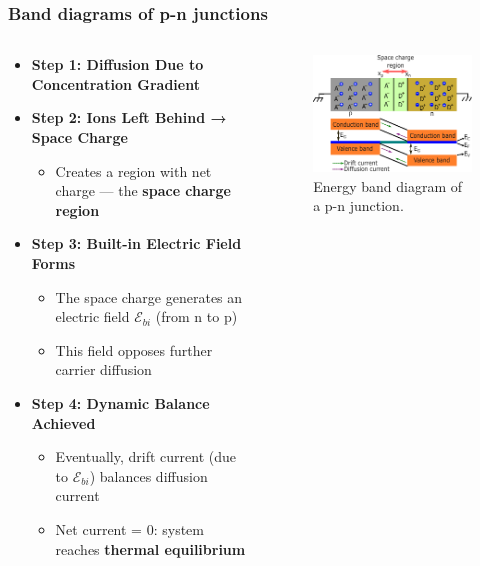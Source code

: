 \begin{frame}
	\frametitle{Band diagrams of p-n junctions}
	\begin{columns}
		\begin{column}{0.5\textwidth}
			\begin{itemize}
				\item \textbf{Step 1: Diffusion Due to Concentration Gradient}
				\item \textbf{Step 2: Ions Left Behind → Space Charge}
				\begin{itemize}
					\item Creates a region with net charge — the \textbf{space charge region}
				\end{itemize}
				\item \textbf{Step 3: Built-in Electric Field Forms}
				\begin{itemize}
					\item The space charge generates an electric field $\mathcal{E}_{bi}$ (from n to p)
					\item This field opposes further carrier diffusion
				\end{itemize}
				\item \textbf{Step 4: Dynamic Balance Achieved}
				\begin{itemize}
					\item Eventually, drift current (due to $\mathcal{E}_{bi}$) balances diffusion current
					\item Net current = 0: system reaches \textbf{thermal equilibrium}
				\end{itemize}
			\end{itemize}
		\end{column}
		\begin{column}{0.5\textwidth}
			\begin{figure}
				\centering
				\includegraphics[scale=1]{fig/lec03/band_diagram_pn_junction_big.pdf}
				\caption{Energy band diagram of a p-n junction.}
				\label{fig:pn_junction}
			\end{figure}
		\end{column}
	\end{columns}
\end{frame}

